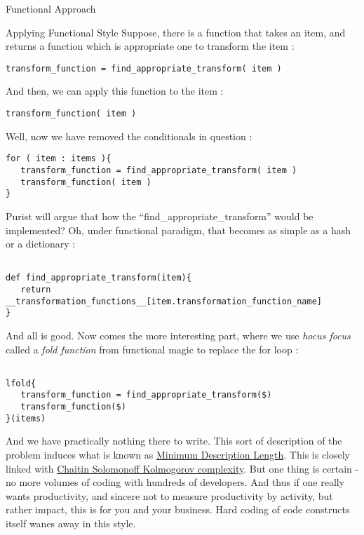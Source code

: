 \begin{section}{Functional Approach}
\begin{subsection}{Applying Functional Style}
Suppose, there is a function that takes an item, and returns a function 
which is appropriate one to transform the item :

\begin{lstlisting}[style=JexlStyle]
transform_function = find_appropriate_transform( item )
\end{lstlisting}

And then, we can apply this function to the item :

\begin{lstlisting}[style=JexlStyle]
transform_function( item )
\end{lstlisting}

Well, now we have removed the conditionals in question :

\begin{lstlisting}[style=JexlStyle]
for ( item : items ){
   transform_function = find_appropriate_transform( item )
   transform_function( item )
}
\end{lstlisting}


Purist will argue that how the ``find\_appropriate\_transform'' would be implemented? 
Oh, under functional paradigm, that becomes as simple as a hash or a dictionary :

\begin{lstlisting}[style=JexlStyle]

def find_appropriate_transform(item){
   return __transformation_functions__[item.transformation_function_name]
}

\end{lstlisting}


And all is good. Now comes the more interesting part, where we use \emph{hocus focus} called a \emph{fold function}  
from functional magic  to replace the for loop :

\begin{lstlisting}[style=JexlStyle]

lfold{
   transform_function = find_appropriate_transform($)
   transform_function($)
}(items)
\end{lstlisting}


And we have practically nothing there to write. This sort of description of the problem induces what is known as 
\href{https://en.wikipedia.org/wiki/Minimum_description_length}{Minimum Description Length}. 
This is closely linked with \href{https://en.wikipedia.org/wiki/Kolmogorov_complexity}{Chaitin Solomonoff Kolmogorov complexity}.
But one thing is certain - no more volumes of coding with hundreds of developers. And thus if one really wants productivity, and sincere not to measure productivity by activity, but rather impact, this is for you and your business. Hard coding of code constructs itself wanes away in this style.


\end{subsection}
\end{section}
